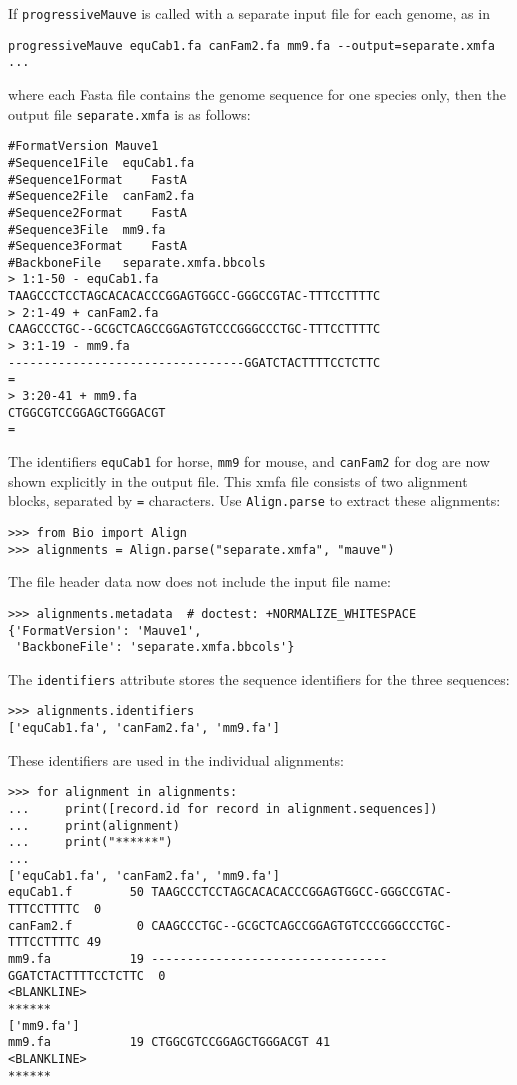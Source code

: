 If \verb|progressiveMauve| is called with a separate input file for each genome, as in
\begin{verbatim}
progressiveMauve equCab1.fa canFam2.fa mm9.fa --output=separate.xmfa ...
\end{verbatim}
where each Fasta file contains the genome sequence for one species only, then the output file \verb|separate.xmfa| is as follows:
\begin{verbatim}
#FormatVersion Mauve1
#Sequence1File	equCab1.fa
#Sequence1Format	FastA
#Sequence2File	canFam2.fa
#Sequence2Format	FastA
#Sequence3File	mm9.fa
#Sequence3Format	FastA
#BackboneFile	separate.xmfa.bbcols
> 1:1-50 - equCab1.fa
TAAGCCCTCCTAGCACACACCCGGAGTGGCC-GGGCCGTAC-TTTCCTTTTC
> 2:1-49 + canFam2.fa
CAAGCCCTGC--GCGCTCAGCCGGAGTGTCCCGGGCCCTGC-TTTCCTTTTC
> 3:1-19 - mm9.fa
---------------------------------GGATCTACTTTTCCTCTTC
=
> 3:20-41 + mm9.fa
CTGGCGTCCGGAGCTGGGACGT
=
\end{verbatim}
The identifiers \verb+equCab1+ for horse, \verb+mm9+ for mouse, and \verb+canFam2+ for dog are now shown explicitly in the output file.
This xmfa file consists of two alignment blocks, separated by \verb|=| characters. Use \verb|Align.parse| to extract these alignments:
\begin{verbatim}
>>> from Bio import Align
>>> alignments = Align.parse("separate.xmfa", "mauve")
\end{verbatim}
The file header data now does not include the input file name:
\begin{verbatim}
>>> alignments.metadata  # doctest: +NORMALIZE_WHITESPACE
{'FormatVersion': 'Mauve1',
 'BackboneFile': 'separate.xmfa.bbcols'}
\end{verbatim}
The \verb|identifiers| attribute stores the sequence identifiers for the three sequences:
\begin{verbatim}
>>> alignments.identifiers
['equCab1.fa', 'canFam2.fa', 'mm9.fa']
\end{verbatim}
These identifiers are used in the individual alignments:
\begin{verbatim}
>>> for alignment in alignments:
...     print([record.id for record in alignment.sequences])
...     print(alignment)
...     print("******")
...
['equCab1.fa', 'canFam2.fa', 'mm9.fa']
equCab1.f        50 TAAGCCCTCCTAGCACACACCCGGAGTGGCC-GGGCCGTAC-TTTCCTTTTC  0
canFam2.f         0 CAAGCCCTGC--GCGCTCAGCCGGAGTGTCCCGGGCCCTGC-TTTCCTTTTC 49
mm9.fa           19 ---------------------------------GGATCTACTTTTCCTCTTC  0
<BLANKLINE>
******
['mm9.fa']
mm9.fa           19 CTGGCGTCCGGAGCTGGGACGT 41
<BLANKLINE>
******
\end{verbatim}

